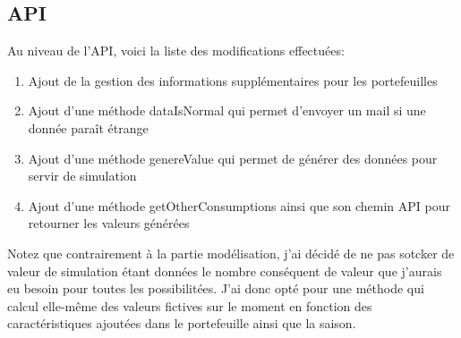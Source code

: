 \subsection{API}

\begin{flushleft}
Au niveau de l'API, voici la liste des modifications effectuées:
\end{flushleft}

\begin{enumerate}
    \item Ajout de la gestion des informations supplémentaires pour les portefeuilles
    \item Ajout d'une méthode dataIsNormal qui permet d'envoyer un mail si une donnée paraît étrange
    \item Ajout d'une méthode genereValue qui permet de générer des données pour servir de simulation
    \item Ajout d'une méthode getOtherConsumptions ainsi que son chemin API pour retourner les valeurs générées
\end{enumerate}

\begin{flushleft}
Notez que contrairement à la partie modélisation, j'ai décidé de ne pas sotcker de valeur de simulation étant données le nombre conséquent de valeur que j'aurais eu besoin pour toutes les possibilitées. J'ai donc opté pour une méthode qui calcul elle-même des valeurs fictives sur le moment en fonction des caractéristiques ajoutées dans le portefeuille ainsi que la saison.
\end{flushleft}

